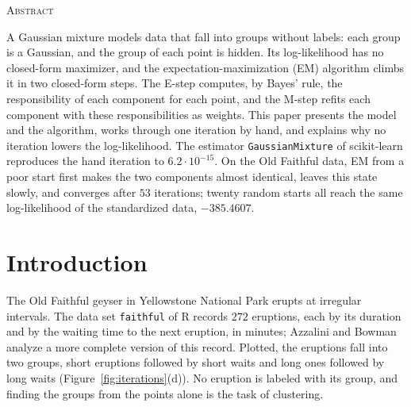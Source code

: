 \documentclass[11pt,a4paper]{amsart}
\numberwithin{equation}{section}
\theoremstyle{plain}
\theoremstyle{definition}
\theoremstyle{remark}
\newcommand{\code}[1]{\texttt{#1}}
\begin{document}
\begin{center}\scshape Abstract\end{center}
\noindent
A Gaussian mixture models data that fall into groups without labels:
each group is a Gaussian, and the group of each point is hidden. Its
log-likelihood has no closed-form maximizer, and the
expectation-maximization (EM) algorithm climbs it in two closed-form
steps. The E-step computes, by Bayes' rule, the responsibility of each
component for each point, and the M-step refits each component with
these responsibilities as weights. This paper presents the model and the
algorithm, works through one iteration by hand, and explains why no
iteration lowers the log-likelihood. The estimator
\code{GaussianMixture} of scikit-learn reproduces the hand iteration to
$6.2 \cdot 10^{-15}$. On the Old Faithful data, EM from a poor start
first makes the two components almost identical, leaves this state
slowly, and converges after $53$ iterations; twenty random starts all
reach the same log-likelihood of the standardized data, $-385.4607$.

\bigskip
\setcounter{tocdepth}{1}
\tableofcontents

\section{Introduction}\label{sec:intro}

The Old Faithful geyser in Yellowstone National Park erupts at irregular
intervals. The data set \code{faithful} of R records $272$ eruptions,
each by its duration and by the waiting time to the next eruption, in
minutes; Azzalini and Bowman~\cite{azzalini1990} analyze a more complete
version of this record. Plotted, the eruptions fall into two groups,
short eruptions followed by short waits and long ones followed by long
waits (Figure~\ref{fig:iterations}(d)). No eruption is labeled with its
group, and finding the groups from the points alone is the task of
clustering.
\end{document}
